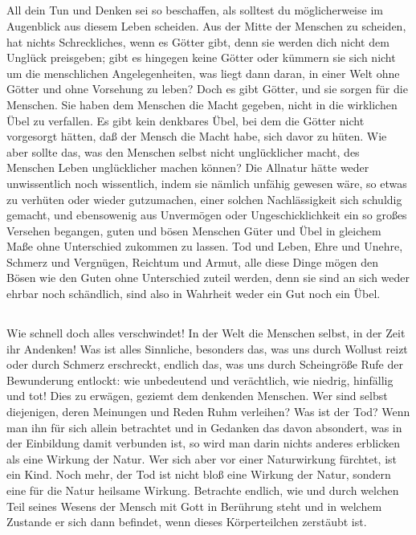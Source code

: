 \documentclass[12pt,ngerman,parskip=full]{scrartcl}
\newcounter{abschnitt}
\newcommand{\abschnitt}{\subsection*{\theabschnitt}\stepcounter{abschnitt}}
\begin{document}
\abschnitt

All dein Tun und Denken sei so beschaffen, als solltest du möglicherweise im Augenblick aus diesem Leben scheiden. Aus der Mitte der Menschen zu scheiden, hat nichts Schreckliches, wenn es Götter gibt, denn sie werden dich nicht dem Unglück preisgeben; gibt es hingegen keine Götter oder kümmern sie sich nicht um die menschlichen Angelegenheiten, was liegt dann daran, in einer Welt ohne Götter und ohne Vorsehung zu leben? Doch es gibt Götter, und sie sorgen für die Menschen. Sie haben dem Menschen die Macht gegeben, nicht in die wirklichen Übel zu verfallen. Es gibt kein denkbares Übel, bei dem die Götter nicht vorgesorgt hätten, daß der Mensch die Macht habe, sich davor zu hüten. Wie aber sollte das, was den Menschen selbst nicht unglücklicher macht, des Menschen Leben unglücklicher machen können? Die Allnatur hätte weder unwissentlich noch wissentlich, indem sie nämlich unfähig gewesen wäre, so etwas zu verhüten oder wieder gutzumachen, einer solchen Nachlässigkeit sich schuldig gemacht, und ebensowenig aus Unvermögen oder Ungeschicklichkeit ein so großes Versehen begangen, guten und bösen Menschen Güter und Übel in gleichem Maße ohne Unterschied zukommen zu lassen. Tod und Leben, Ehre und Unehre, Schmerz und Vergnügen, Reichtum und Armut, alle diese Dinge mögen den Bösen wie den Guten ohne Unterschied zuteil werden, denn sie sind an sich weder ehrbar noch schändlich, sind also in Wahrheit weder ein Gut noch ein Übel.

\abschnitt

Wie schnell doch alles verschwindet! In der Welt die Menschen selbst, in der Zeit ihr Andenken! Was ist alles Sinnliche, besonders das, was uns durch Wollust reizt oder durch Schmerz erschreckt, endlich das, was uns durch Scheingröße Rufe der Bewunderung entlockt: wie unbedeutend und verächtlich, wie niedrig, hinfällig und tot! Dies zu erwägen, geziemt dem denkenden Menschen. Wer sind selbst diejenigen, deren Meinungen und Reden Ruhm verleihen? Was ist der Tod? Wenn man ihn für sich allein betrachtet und in Gedanken das davon absondert, was in der Einbildung damit verbunden ist, so wird man darin nichts anderes erblicken als eine Wirkung der Natur. Wer sich aber vor einer Naturwirkung fürchtet, ist ein Kind. Noch mehr, der Tod ist nicht bloß eine Wirkung der Natur, sondern eine für die Natur heilsame Wirkung. Betrachte endlich, wie und durch welchen Teil seines Wesens der Mensch mit Gott in Berührung steht und in welchem Zustande er sich dann befindet, wenn dieses Körperteilchen zerstäubt ist.
\end{document}

